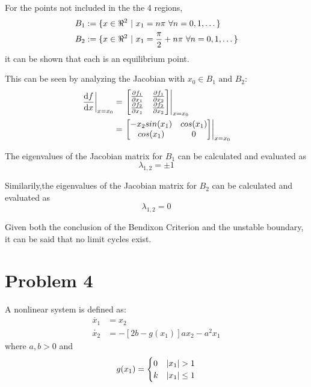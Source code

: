 \documentclass[letter]{article}
\begin{document}
For the points not included in the the 4 regions,
\begin{equation}
	\begin{aligned}
		B_1 &:= \{x \in \real^2 \ | \ x_1 = n \pi \ \forall n = 0, 1, \dots\}\\
		B_2 &:= \{x \in \real^2 \ | \ x_1 = \frac{\pi}{2} + n \pi \ \forall n = 0, 1, \dots\}
	\end{aligned}
\end{equation}
it can be shown that each is an equilibrium point.

This can be seen by analyzing the Jacobian with $x_0 \in B_1 \text{ and } B_2$:
\begin{align}
	\eval{\dv{f}{x}}_{x=x_0} 
	&= \eval{\mqty[\pdv{f_1}{x_1} & \pdv{f_1}{x_2}\\
		\pdv{f_2}{x_1} & \pdv{f_2}{x_2}]}_{x=x_0}\\
	&= \eval{\mqty[-x_2 sin(x_1) & cos(x_1)\\ cos(x_1) & 0]}_{x=x_0}
\end{align}

The eigenvalues of the Jacobian matrix for $B_1$ can be calculated and evaluated as
\begin{equation}
	\lambda_{1,2} = \pm 1
\end{equation}

Similarily,the eigenvalues of the Jacobian matrix for $B_2$ can be calculated and evaluated as
\begin{equation}
	\lambda_{1,2} = 0
\end{equation}

Given both the conclusion of the Bendixon Criterion and the unstable boundary, it can be said that no limit cycles exist.




\newpage
\section{Problem 4}
A nonlinear system is defined as:
\begin{equation}
	\begin{aligned}
		\dot{x_1} &= x_2\\
		\dot{x_2} &= -[2b - g(x_1)]ax_2 - a^2 x_1
	\end{aligned}
\end{equation}
where $a,b>0$ and
\begin{equation}
	g(x_1) = 
	\begin{cases}
		0 & \abs{x_1} > 1\\
		k & \abs{x_1} \leq 1
	\end{cases}
\end{equation}
\end{document}
